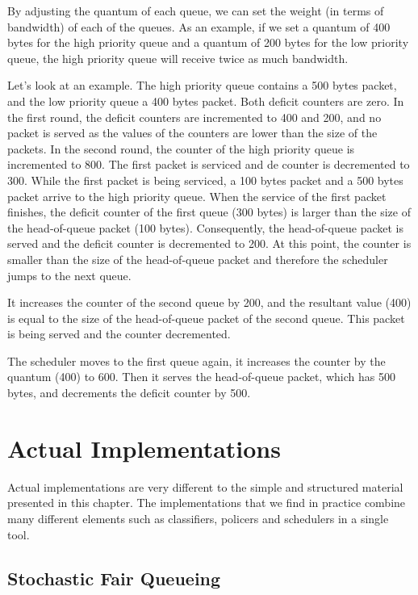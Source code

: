 By adjusting the quantum of each queue, we can set the weight (in terms of bandwidth) of each of the queues.
As an example, if we set a quantum of 400 bytes for the high priority queue and a quantum of 200 bytes for the low priority queue, the high priority queue will receive twice as much bandwidth.

Let's look at an example.
The high priority queue contains a 500 bytes packet, and the low priority queue a 400 bytes packet.
Both deficit counters are zero.
In the first round, the deficit counters are incremented to 400 and 200, and no packet is served as the values of the counters are lower than the size of the packets.
In the second round, the counter of the high priority queue is incremented to 800.
The first packet is serviced and de counter is decremented to 300.
While the first packet is being serviced, a 100 bytes packet and a 500 bytes packet arrive to the high priority queue.
When the service of the first packet finishes, the deficit counter of the first queue (300 bytes) is larger than the size of the head-of-queue packet (100 bytes).
Consequently, the head-of-queue packet is served and the deficit counter is decremented to 200.
At this point, the counter is smaller than the size of the head-of-queue packet and therefore the scheduler jumps to the next queue.

It increases the counter of the second queue by 200, and the resultant value (400) is equal to the size of the head-of-queue packet of the second queue.
This packet is being served and the counter decremented.

The scheduler moves to the first queue again, it increases the counter by the quantum (400) to 600.
Then it serves the head-of-queue packet, which has 500 bytes, and decrements the deficit counter by 500.

\section{Actual Implementations}

Actual implementations are very different to the simple and structured material presented in this chapter.
The implementations that we find in practice combine many different elements such as classifiers, policers and schedulers in a single tool.

\subsection{Stochastic Fair Queueing}

